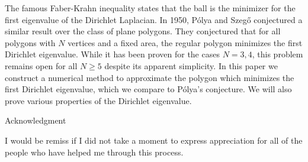 \documentclass[12pt]{report}
\numberwithin{definition}{section}
\begin{document}
  The famous Faber-Krahn inequality states that the ball is the minimizer for the first eigenvalue of the Dirichlet Laplacian.
  In 1950, Pólya and Szegő conjectured a similar result over the class of plane polygons.
  They conjectured that for all polygons with $N$ vertices and a fixed area, the regular polygon minimizes the first Dirichlet eigenvalue.
  While it has been proven for the cases $N=3,4$, this problem remains open for all $N \geq 5$ despite its apparent simplicity.
  In this paper we construct a numerical method to approximate the polygon which minimizes the first Dirichlet eigenvalue, which we compare to Pólya's conjecture.
  We will also prove various properties of the Dirichlet eigenvalue.


  
\break



\begin{center}
Acknowledgment
\end{center}
    I would be remiss if I did not take a moment to express appreciation for all of the people who have helped me through this process.
    
\end{document}
